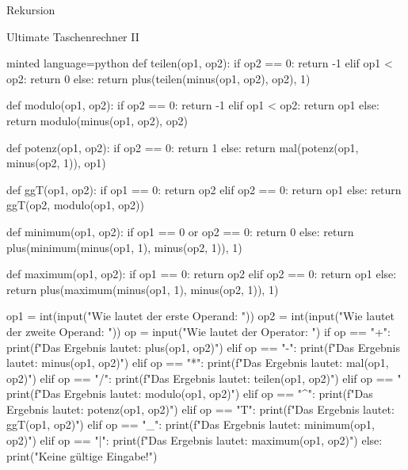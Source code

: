 \begin{task}[points=auto]{Rekursion}
\begin{subtask*}[points=0]{Ultimate Taschenrechner II }
\begin{solution}
\begin{codeBlock}[]{minted language=python}
                def teilen(op1, op2):
                    if op2 == 0:
                        return -1
                    elif op1 < op2:
                        return 0
                    else:
                        return plus(teilen(minus(op1, op2), op2), 1)


                def modulo(op1, op2):
                    if op2 == 0:
                        return -1
                    elif op1 < op2:
                        return op1
                    else:
                        return modulo(minus(op1, op2), op2)


                def potenz(op1, op2):
                    if op2 == 0:
                        return 1
                    else:
                        return mal(potenz(op1, minus(op2, 1)), op1)


                def ggT(op1, op2):
                    if op1 == 0:
                        return op2
                    elif op2 == 0:
                        return op1
                    else:
                        return ggT(op2, modulo(op1, op2))


                def minimum(op1, op2):
                    if op1 == 0 or op2 == 0:
                        return 0
                    else:
                        return plus(minimum(minus(op1, 1), minus(op2, 1)), 1)


                def maximum(op1, op2):
                    if op1 == 0:
                        return op2
                    elif op2 == 0:
                        return op1
                    else:
                        return plus(maximum(minus(op1, 1), minus(op2, 1)), 1)


                op1 = int(input("Wie lautet der erste Operand: "))
                op2 = int(input("Wie lautet der zweite Operand: "))
                op = input("Wie lautet der Operator: ")
                if op == "+":
                    print(f"Das Ergebnis lautet: {plus(op1, op2)}")
                elif op == "-":
                    print(f"Das Ergebnis lautet: {minus(op1, op2)}")
                elif op == "*":
                    print(f"Das Ergebnis lautet: {mal(op1, op2)}")
                elif op == "/":
                    print(f"Das Ergebnis lautet: {teilen(op1, op2)}")
                elif op == "%
                    print(f"Das Ergebnis lautet: {modulo(op1, op2)}")
                elif op == "^":
                    print(f"Das Ergebnis lautet: {potenz(op1, op2)}")
                elif op == "T":
                    print(f"Das Ergebnis lautet: {ggT(op1, op2)}")
                elif op == "_":
                    print(f"Das Ergebnis lautet: {minimum(op1, op2)}")
                elif op == "|":
                    print(f"Das Ergebnis lautet: {maximum(op1, op2)}")
                else:
                    print("Keine gültige Eingabe!")
            \end{codeBlock}
        \end{solution}
    \end{subtask*}
\end{task}
